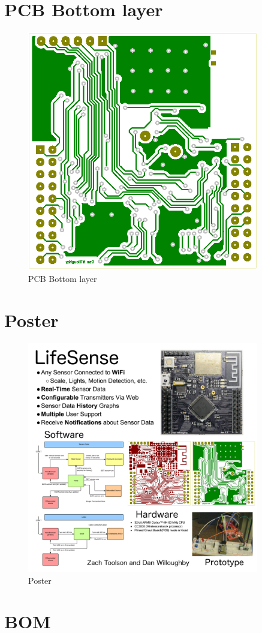 \documentclass[letterpaper, 12 pt]{article}
\begin{document}
\newpage
\section{PCB Bottom layer}
\begin{figure}[H]
\centering
\includegraphics[width=0.9\textwidth]{back.png}
\caption{PCB Bottom layer}
\end{figure}

\newpage
\section{Poster}
\begin{figure}[H]
\centering
\includegraphics[width=0.9\textwidth]{poster.png}
\caption{Poster}
\end{figure}

\section{BOM}

\end{document}
